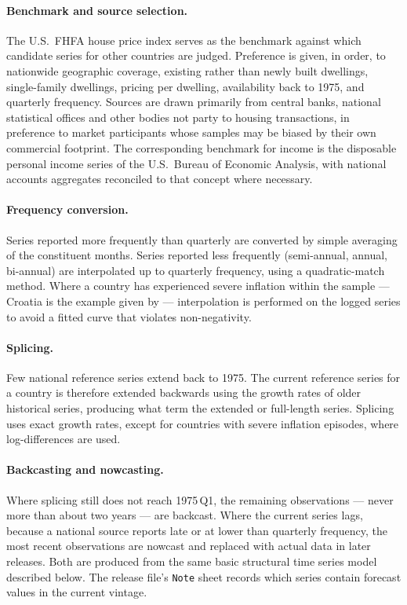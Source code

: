 \paragraph{Benchmark and source selection.}
The U.S.\ FHFA house price index serves as the benchmark against which
candidate series for other countries are judged. Preference is given, in
order, to nationwide geographic coverage, existing rather than newly built
dwellings, single-family dwellings, pricing per dwelling, availability back
to 1975, and quarterly frequency. Sources are drawn primarily from central
banks, national statistical offices and other bodies not party to housing
transactions, in preference to market participants whose samples may be
biased by their own commercial footprint. The corresponding benchmark for
income is the disposable personal income series of the U.S.\ Bureau of
Economic Analysis, with national accounts aggregates reconciled to that
concept where necessary.

\paragraph{Frequency conversion.}
Series reported more frequently than quarterly are converted by simple
averaging of the constituent months. Series reported less frequently
(semi-annual, annual, bi-annual) are interpolated up to quarterly frequency,
using a quadratic-match method. Where a country has experienced severe
inflation within the sample --- Croatia is the example given by
\citet{mack2011} --- interpolation is performed on the logged series to avoid
a fitted curve that violates non-negativity.

\paragraph{Splicing.}
Few national reference series extend back to 1975. The current reference
series for a country is therefore extended backwards using the growth rates
of older historical series, producing what \citet{mack2011} term the extended
or full-length series. Splicing uses exact growth rates, except for countries
with severe inflation episodes, where log-differences are used.

\paragraph{Backcasting and nowcasting.}
Where splicing still does not reach 1975\,Q1, the remaining observations ---
never more than about two years --- are backcast. Where the current series
lags, because a national source reports late or at lower than quarterly
frequency, the most recent observations are nowcast and replaced with actual
data in later releases. Both are produced from the same basic structural time
series model described below. The release file's \texttt{Note} sheet records
which series contain forecast values in the current vintage.

